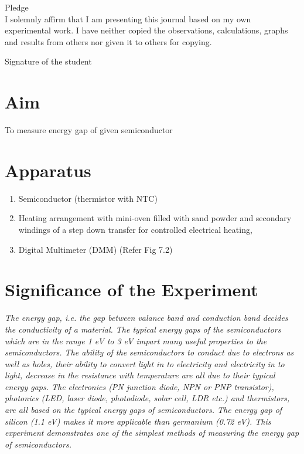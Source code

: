 \documentclass[12pt]{article}
\begin{document}
	\begin{center}
	{\Large Pledge}\\
	\vspace{0.5cm}
	I solemnly affirm that I am presenting this journal based on my own experimental work. I have neither copied the observations, calculations, graphs and results from others nor given it to others for copying.\\
		\end{center}
	
	\vspace{0.5cm}
	
    \begin{flushright}
	{\large Signature of the student}\\
	\vspace{1cm}
	 \end{flushright}
	
	\section{Aim}
	\noindent
	To measure energy gap of given semiconductor

	
\section{Apparatus}


		\begin{enumerate}
			\item Semiconductor (thermistor with NTC)
			\item Heating arrangement with mini-oven filled with sand powder and
			secondary windings of a step down transfer for controlled electrical
			heating,
			\item Digital Multimeter (DMM) (Refer Fig 7.2)
		\end{enumerate}

\section{Significance of the Experiment}
	\textit{The energy gap, i.e. the gap between valance band and
	conduction band decides the conductivity of a material. The typical energy gaps of the
	semiconductors which are in the range 1 eV to 3 eV impart many useful properties to the
	semiconductors. The ability of the semiconductors to conduct due to electrons as well as holes,
	their ability to convert light in to electricity and electricity in to light, decrease in the resistance
	with temperature are all due to their typical energy gaps. The electronics (PN junction diode,
	NPN or PNP transistor), photonics (LED, laser diode, photodiode, solar cell, LDR etc.) and
	thermistors, are all based on the typical energy gaps of semiconductors. The energy gap of
	silicon (1.1 eV) makes it more applicable than germanium (0.72 eV). This experiment
	demonstrates one of the simplest methods of measuring the energy gap of semiconductors.}
	
\end{document}
